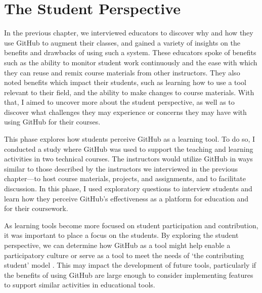 








\chapter{The Student Perspective}

In the previous chapter, we interviewed educators to discover why and how they use GitHub to augment their classes, and gained a variety of insights on the benefits and drawbacks of using such a system. These educators spoke of benefits such as the ability to monitor student work continuously and the ease with which they can reuse and remix course materials from other instructors. They also noted benefits which impact their students, such as learning how to use a tool relevant to their field, and the ability to make changes to course materials. With that, I aimed to uncover more about the student perspective, as well as to discover what challenges they may experience or concerns they may have with using GitHub for their courses.

This phase explores how students perceive GitHub as a learning tool. To do so, I conducted a study where GitHub was used to support the teaching and learning activities in two technical courses. The instructors would utilize GitHub in ways similar to those described by the instructors we interviewed in the previous chapter---to host course materials, projects, and assignments, and to facilitate discussion. In this phase, I used exploratory questions to interview students and learn how they perceive GitHub's effectiveness as a platform for education and for their coursework.

As learning tools become more focused on student participation and contribution, it was important to place a focus on the students. By exploring the student perspective, we can determine how GitHub as a tool might help enable a participatory culture \cite{jenkins2009confronting} or serve as a tool to meet the needs of `the contributing student' model \cite{hamer2008contributing}. This may impact the development of future tools, particularly if the benefits of using GitHub are large enough to consider implementing features to support similar activities in educational tools.

